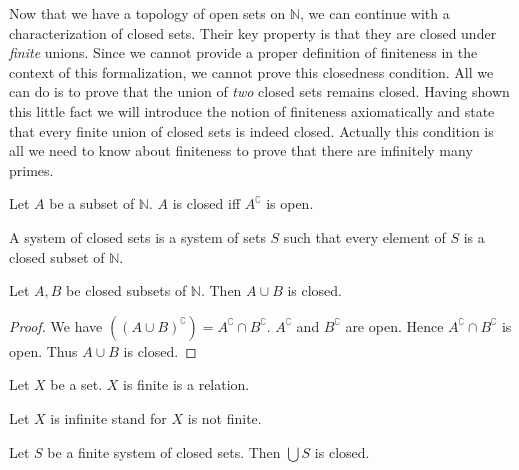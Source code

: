 \documentclass{article}
\begin{document}
  Now that we have a topology of open sets on $\mathbb{N}$, we can continue
  with a characterization of closed sets.
  Their key property is that they are closed under \textit{finite} unions.
  Since we cannot provide a proper definition of finiteness in the context of
  this formalization, we cannot prove this closedness condition.
  All we can do is to prove that the union of \textit{two} closed sets remains
  closed.
  Having shown this little fact we will introduce the notion of finiteness
  axiomatically and state that every finite union of closed sets is indeed
  closed.
  Actually this condition is all we need to know about finiteness to prove that
  there are infinitely many primes.

  \begin{forthel}
    \begin{definition}
      Let $A$ be a subset of $\mathbb{N}$.
      $A$ is closed iff $A^{\complement}$ is open.
    \end{definition}

    \begin{definition}
      A system of closed sets is a system of sets $S$ such that every element of $S$ is a closed subset of $\mathbb{N}$.
    \end{definition}

    \begin{lemma}
      Let $A,B$ be closed subsets of $\mathbb{N}$.
      Then $A \cup B$ is closed.
    \end{lemma}
    \begin{proof}
      We have $((A \cup B)^{\complement}) = A^{\complement} \cap B^{\complement}$.
      $A^{\complement}$ and $B^{\complement}$ are open.
      Hence $A^{\complement} \cap B^{\complement}$ is open.
      Thus $A \cup B$ is closed.
    \end{proof}

    \begin{signature}
      Let $X$ be a set.
      $X$ is finite is a relation.
    \end{signature}

    Let $X$ is infinite stand for $X$ is not finite.

    \begin{axiom}
      Let $S$ be a finite system of closed sets.
      Then $\bigcup S$ is closed.
    \end{axiom}
  \end{forthel}
\end{document}
